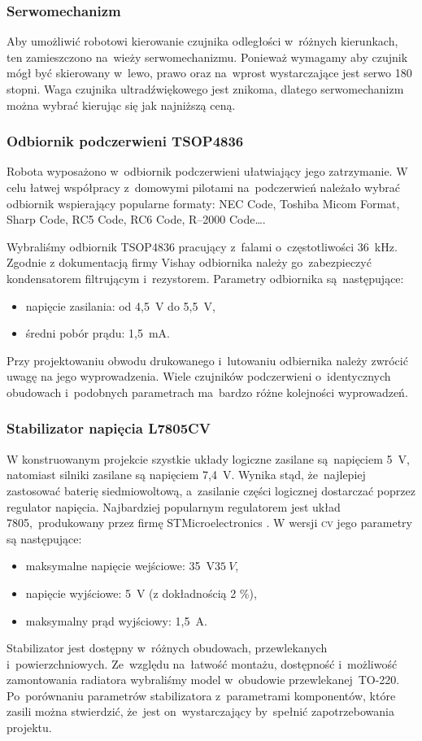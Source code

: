 \documentclass[11pt]{article}
\begin{document}
\subsubsection{Serwomechanizm}
Aby umożliwić robotowi kierowanie czujnika odległości w~różnych kierunkach, ten zamieszczono na~wieży serwomechanizmu.
Ponieważ wymagamy aby czujnik mógł być skierowany w~lewo, prawo oraz na~wprost wystarczające jest serwo 180 stopni.
Waga czujnika ultradźwiękowego jest znikoma, dlatego serwomechanizm można wybrać kierując się jak najniższą ceną.

\subsubsection{Odbiornik podczerwieni TSOP4836}
Robota wyposażono w~odbiornik podczerwieni ułatwiający jego zatrzymanie.
W celu łatwej współpracy z~domowymi pilotami na~podczerwień należało wybrać odbiornik wspierający popularne formaty: NEC Code, Toshiba Micom Format, Sharp Code, RC5 Code, RC6 Code, R–2000 Code\dots.

Wybraliśmy odbiornik TSOP4836 pracujący z~falami o~częstotliwości 36~\si{\kilo\hertz}. Zgodnie z dokumentacją \cite{ir_datasheet} firmy Vishay
 odbiornika należy go~zabezpieczyć kondensatorem filtrującym i~rezystorem. Parametry odbiornika są~następujące:
\begin{itemize}
	\item napięcie zasilania: od 4,5~\si{\volt} do 5,5~\si{\volt},
	\item średni pobór prądu: 1,5~\si{\milli\ampere}.
\end{itemize}
Przy projektowaniu obwodu drukowanego i~lutowaniu odbiernika należy zwrócić uwagę na jego wyprowadzenia.
Wiele czujników podczerwieni o~identycznych obudowach i~podobnych parametrach ma~bardzo różne kolejności wyprowadzeń.

\subsubsection{Stabilizator napięcia L7805CV}
W konstruowanym projekcie szystkie układy logiczne zasilane są~napięciem 5~\si{\volt}, natomiast silniki zasilane są napięciem  7,4~\si{\volt}.
Wynika stąd, że~najlepiej zastosować baterię siedmiowoltową, a~zasilanie części logicznej dostarczać poprzez regulator napięcia. Najbardziej popularnym regulatorem jest układ 7805,~produkowany przez firmę STMicroelectronics \cite{stab_datasheet}. 
W wersji \textsc{cv} jego parametry są następujące:
\begin{itemize}
	\item maksymalne napięcie wejściowe: 35~\si{\volt}$ 35\ V $,
	\item napięcie wyjściowe: 5~\si{\volt} (z dokładnością 2 \%),
	\item maksymalny prąd wyjściowy: 1,5~\si{\ampere}.
\end{itemize}
Stabilizator jest dostępny w~różnych obudowach, przewlekanych i~powierzchniowych. Ze~względu na~łatwość montażu, dostępność i~możliwość zamontowania radiatora wybraliśmy model w~obudowie przewlekanej~TO-220.
Po~porównaniu parametrów stabilizatora z~parametrami komponentów, które zasili można stwierdzić, że~jest on~wystarczający by~spełnić zapotrzebowania projektu.
\end{document}
